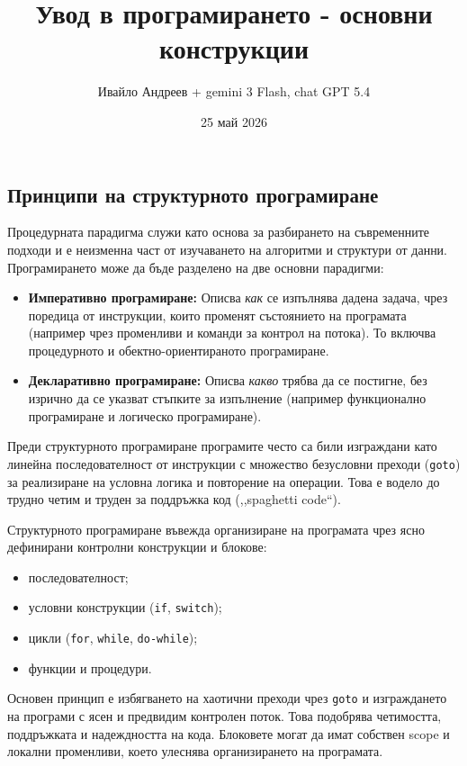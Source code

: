 \documentclass{scrartcl}
\title{Увод в програмирането - основни конструкции}
\author{Ивайло Андреев + gemini 3 Flash, chat GPT 5.4}
\date{25 май 2026}
\begin{document}
\maketitle

\tableofcontents

\newpage

\begin{FlushLeft}

\section{Принципи на структурното програмиране}
Процедурната парадигма служи като основа за разбирането на съвременните подходи и е неизменна част от изучаването на алгоритми и структури от данни. Програмирането може да бъде разделено на две основни парадигми:
\begin{itemize}
    \item \textbf{Императивно програмиране:} Описва \textit{как} се изпълнява дадена задача, чрез поредица от инструкции, които променят състоянието на програмата (например чрез променливи и команди за контрол на потока). То включва процедурното и обектно-ориентираното програмиране.
    \item \textbf{Декларативно програмиране:} Описва \textit{какво} трябва да се постигне, без изрично да се указват стъпките за изпълнение (например функционално програмиране и логическо програмиране).
\end{itemize}

Преди структурното програмиране програмите често са били изграждани като линейна последователност от инструкции с множество безусловни преходи (\texttt{goto}) за реализиране на условна логика и повторение на операции. Това е водело до трудно четим и труден за поддръжка код (,,spaghetti code``).

Структурното програмиране въвежда организиране на програмата чрез ясно дефинирани контролни конструкции и блокове:
\begin{itemize}
    \item последователност;
    \item условни конструкции (\texttt{if}, \texttt{switch});
    \item цикли (\texttt{for}, \texttt{while}, \texttt{do-while});
    \item функции и процедури.
\end{itemize}
Основен принцип е избягването на хаотични преходи чрез \texttt{goto} и изграждането на програми с ясен и предвидим контролен поток. Това подобрява четимостта, поддръжката и надеждността на кода. Блоковете могат да имат собствен scope и локални променливи, което улеснява организирането на програмата.


\end{FlushLeft}
\end{document}
